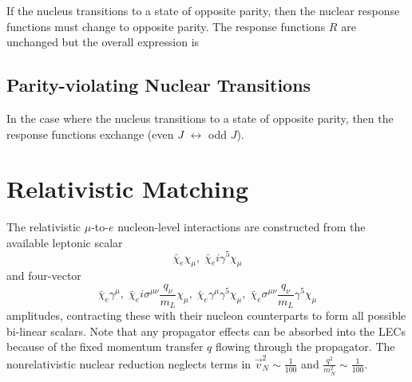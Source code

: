\documentclass{book}[12pt]
\begin{document}
If the nucleus transitions to a state of opposite parity, then the nuclear response functions must change to opposite parity. The response functions $R$ are unchanged but the overall expression is
\section{Parity-violating Nuclear Transitions}
In the case where the nucleus transitions to a state of opposite parity, then the response functions exchange (even $J$ $\leftrightarrow$ odd $J$).
\chapter{Relativistic Matching}
The relativistic $\mu$-to-$e$ nucleon-level interactions are constructed from the available leptonic scalar
\begin{equation}
\bar{\chi}_e\chi_{\mu},\;\bar{\chi}_ei\gamma^5\chi_{\mu}
\end{equation}
and four-vector
\begin{equation}
\bar{\chi}_e\gamma^{\mu},\;\bar{\chi}_ei\sigma^{\mu\nu}\frac{q_{\nu}}{m_L}\chi_{\mu},\;\bar{\chi}_e\gamma^{\mu}\gamma^5\chi_{\mu},\;\bar{\chi}_e\sigma^{\mu\nu}\frac{q_{\nu}}{m_L}\gamma^5\chi_{\mu}
\end{equation}
amplitudes, contracting these with their nucleon counterparts to form all possible bi-linear scalars. Note that any propagator effects can be absorbed into the LECs because of the fixed momentum transfer $q$ flowing through the propagator. The nonrelativistic nuclear reduction neglects terms in $\vec{v}_N^2\sim\frac{1}{100}$ and $\frac{q^2}{m_N^2}\sim\frac{1}{100}$.
\end{document}
